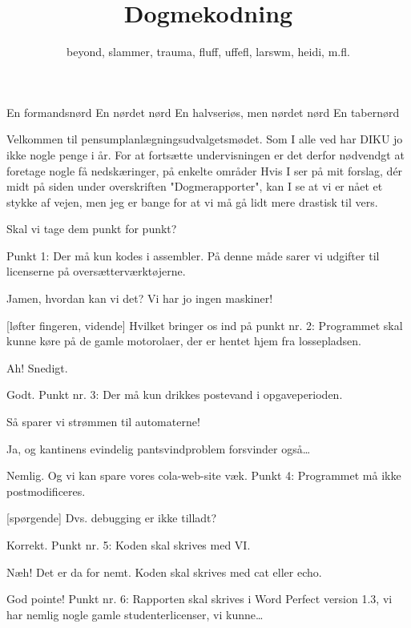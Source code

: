\documentclass[danish]{article}
\title{Dogmekodning}
\author{beyond, slammer, trauma, fluff, uffefl, larswm, heidi, m.fl.}
\begin{document}
\maketitle

\begin{sketch}

\begin{roles}
   En formandsnørd
   En nørdet nørd
   En halvseriøs, men nørdet nørd
   En tabernørd
\end{roles}

 Velkommen til pensumplanlægningsudvalgetsmødet. Som I alle ved har DIKU
jo ikke nogle penge i år. For at fortsætte undervisningen er det derfor nødvendgt
at foretage nogle få nedskæringer, på enkelte områder  Hvis
I ser på mit forslag, d\'er midt på siden under overskriften "Dogmerapporter",
kan I se at vi er nået et stykke af vejen, men jeg er bange for at vi må gå lidt
mere drastisk til vers.

Skal vi tage dem punkt for punkt?

Punkt 1: Der må kun kodes i assembler. På denne måde sarer vi udgifter til
licenserne på oversætterværktøjerne.

 Jamen, hvordan kan vi det? Vi har jo ingen maskiner!

[løfter fingeren, vidende] Hvilket bringer os ind på punkt nr.
2: Programmet skal kunne køre på de gamle motorolaer, der er hentet hjem fra
lossepladsen.

 Ah! Snedigt.

 Godt. Punkt nr. 3: Der må kun drikkes postevand i opgaveperioden.

 Så sparer vi strømmen til automaterne!

 Ja, og kantinens evindelig pantsvindproblem forsvinder også\ldots

 Nemlig. Og vi kan spare vores cola-web-site væk. Punkt 4: Programmet må
ikke postmodificeres.

[spørgende] Dvs. debugging er ikke tilladt?

 Korrekt. Punkt nr. 5: Koden skal skrives med VI.

 Næh! Det er da for nemt. Koden skal skrives med cat eller echo.

 God pointe!  Punkt nr. 6: Rapporten skal skrives i
Word Perfect version 1.3, vi har nemlig nogle gamle studenterlicenser, vi
kunne\ldots{} 


\end{sketch}
\end{document}
